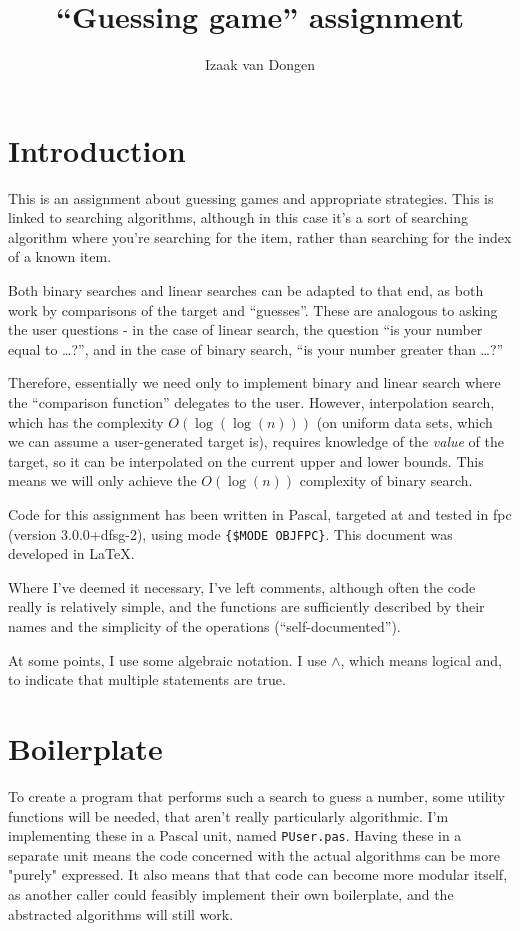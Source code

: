 \documentclass{article}
\title{``Guessing game'' assignment}
\author{Izaak van Dongen}
\begin{document}
    \maketitle
    \tableofcontents
    \lstlistoflistings

    \section{Introduction}
    This is an assignment about guessing games and appropriate strategies. This
    is linked to searching algorithms, although in this case it's a sort of
    searching algorithm where you're searching for the item, rather than
    searching for the index of a known item.

    Both binary searches and linear
    searches can be adapted to that end, as both work by comparisons of the
    target and ``guesses''. These are analogous to asking the user questions - in
    the case of linear search, the question ``is your number equal to \ldots?'',
    and in the case of binary search, ``is your number greater than \ldots?''

    Therefore, essentially we need only to implement binary and linear search
    where the ``comparison function'' delegates to the user.  However,
    interpolation search, which has the complexity $O(\log(\log(n)))$ (on uniform
    data sets, which we can assume a user-generated target is), requires
    knowledge of the \textit{value} of the target, so it can be interpolated on
    the current upper and lower bounds. This means we will only achieve the
    $O(\log(n))$ complexity of binary search.

    Code for this assignment has been written in Pascal, targeted at and tested
    in fpc (version 3.0.0+dfsg-2), using mode \verb|{$MODE OBJFPC}|. This
    document was developed in \LaTeX.

    Where I've deemed it necessary, I've left comments, although often the code
    really is relatively simple, and the functions are sufficiently described
    by their names and the simplicity of the operations (``self-documented'').

    At some points, I use some algebraic notation. I use $\wedge$, which means
    logical and, to indicate that multiple statements are true.

    \section{Boilerplate}
    To create a program that performs such a search to guess a number, some
    utility functions will be needed, that aren't really particularly
    algorithmic. I'm implementing these in a Pascal unit, named
    \verb|PUser.pas|. Having these in a separate unit means the code concerned
    with the actual algorithms can be more "purely" expressed. It also means
    that that code can become more modular itself, as another caller could
    feasibly implement their own boilerplate, and the abstracted algorithms
    will still work.
\end{document}
